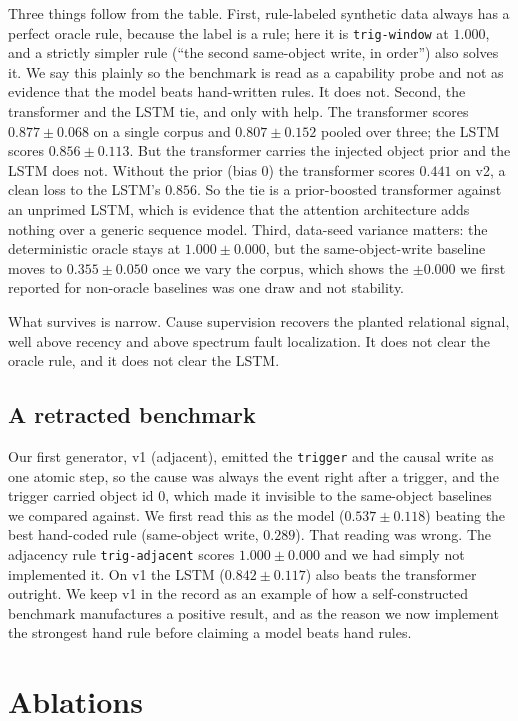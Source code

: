 \documentclass[11pt]{article}
\newcommand{\code}[1]{\texttt{#1}}
\begin{document}
Three things follow from the table. First, rule-labeled synthetic data always has a perfect oracle rule, because the label is a rule; here it is \code{trig-window} at $1.000$, and a strictly simpler rule (``the second same-object write, in order'') also solves it. We say this plainly so the benchmark is read as a capability probe and not as evidence that the model beats hand-written rules. It does not. Second, the transformer and the LSTM tie, and only with help. The transformer scores $0.877 \pm 0.068$ on a single corpus and $0.807 \pm 0.152$ pooled over three; the LSTM scores $0.856 \pm 0.113$. But the transformer carries the injected object prior and the LSTM does not. Without the prior (bias 0) the transformer scores $0.441$ on v2, a clean loss to the LSTM's $0.856$. So the tie is a prior-boosted transformer against an unprimed LSTM, which is evidence that the attention architecture adds nothing over a generic sequence model. Third, data-seed variance matters: the deterministic oracle stays at $1.000 \pm 0.000$, but the same-object-write baseline moves to $0.355 \pm 0.050$ once we vary the corpus, which shows the $\pm 0.000$ we first reported for non-oracle baselines was one draw and not stability.

What survives is narrow. Cause supervision recovers the planted relational signal, well above recency and above spectrum fault localization. It does not clear the oracle rule, and it does not clear the LSTM.

\subsection{A retracted benchmark}

Our first generator, v1 (adjacent), emitted the \code{trigger} and the causal write as one atomic step, so the cause was always the event right after a trigger, and the trigger carried object id 0, which made it invisible to the same-object baselines we compared against. We first read this as the model ($0.537 \pm 0.118$) beating the best hand-coded rule (same-object write, $0.289$). That reading was wrong. The adjacency rule \code{trig-adjacent} scores $1.000 \pm 0.000$ and we had simply not implemented it. On v1 the LSTM ($0.842 \pm 0.117$) also beats the transformer outright. We keep v1 in the record as an example of how a self-constructed benchmark manufactures a positive result, and as the reason we now implement the strongest hand rule before claiming a model beats hand rules.

\section{Ablations}
\label{sec:ablations}
\end{document}
